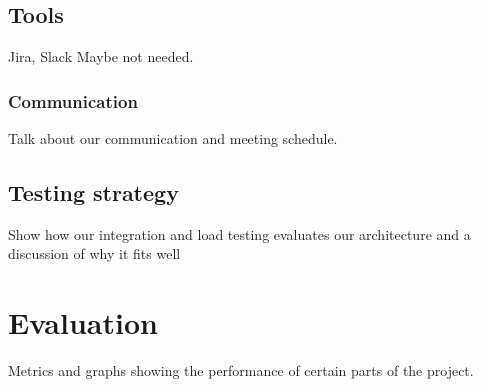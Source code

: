 \documentclass[prodmode,acmtosem]{acmsmall} %
\begin{document}
\subsection{Tools}
Jira, Slack Maybe not needed.

\subsubsection{Communication}
Talk about our communication and meeting schedule.

\subsection{Testing strategy}
Show how our integration and load testing evaluates our architecture and a discussion of why it fits well

\section{Evaluation}
Metrics and graphs showing the performance of certain parts of the project.
\end{document}

